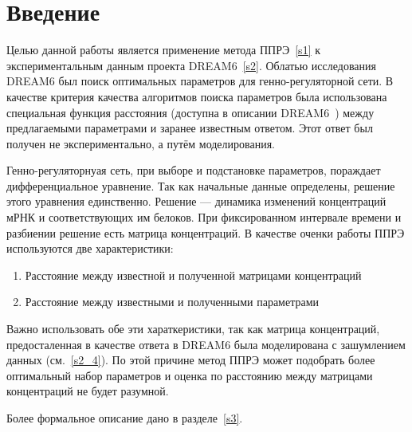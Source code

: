 \chapter*{Введение}							%

Целью данной работы является применение метода ППРЭ~\ref{s1} к экспериментальным
данным проекта DREAM6~\ref{s2}. Облатью исследования DREAM6 был поиск 
оптимальных параметров для генно-регуляторной сети. В качестве критерия качества 
алгоритмов поиска параметров была использована специальная функция расстояния 
(доступна в описании DREAM6~\cite{bibDREAM}) между предлагаемыми параметрами и 
заранее известным ответом. Этот ответ был получен не экспериментально, а путём 
моделирования.

Генно-регуляторнуая сеть, при выборе и подстановке параметров, пораждает 
дифференциальное уравнение. Так как начальные данные определены, решение этого 
уравнения единственно. Решение — динамика изменений концентраций мРНК и 
соответствующих им белоков. При фиксированном интервале времени и разбиении 
решение есть матрица концентраций. В качестве оченки работы ППРЭ используются
две характеристики: 
\begin{enumerate}
	\item Расстояние между известной и полученной матрицами концентраций
	\item Расстояние между известными и полученными параметрами
\end{enumerate}
Важно использовать обе эти хараткеристики, так как матрица концентраций, 
предосталенная в качестве ответа в DREAM6 была моделирована с зашумлением данных
(см.~\ref{s2_4}). По этой причине метод ППРЭ может подобрать более оптимальный 
набор параметров и оценка по расстоянию между матрицами концентраций не будет 
разумной.

Более формальное описание дано в разделе~\ref{s3}.

\clearpage
